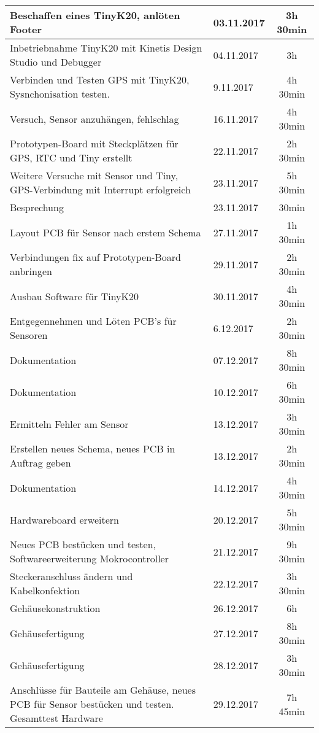 \begin{longtable}{p{9cm}|p{2cm}|c}
		Beschaffen eines TinyK20, anlöten Footer & 03.11.2017 & 3h 30min \\\midrule
		Inbetriebnahme TinyK20 mit Kinetis Design Studio und Debugger & 04.11.2017 & 3h \\ \midrule
		Verbinden und Testen GPS mit TinyK20, Sysnchonisation testen. & 9.11.2017 & 4h 30min\\\midrule
		Versuch, Sensor anzuhängen, fehlschlag & 16.11.2017 & 4h 30min\\\midrule
		Prototypen-Board mit Steckplätzen für GPS, RTC und Tiny erstellt & 22.11.2017 & 2h 30min \\ \midrule
		Weitere Versuche mit Sensor und Tiny, GPS-Verbindung mit Interrupt erfolgreich & 23.11.2017 & 5h 30min\\ \midrule
		Besprechung & 23.11.2017 & 30min \\ \midrule
		Layout PCB für Sensor nach erstem Schema & 27.11.2017 & 1h 30min \\\midrule
		Verbindungen fix auf Prototypen-Board anbringen & 29.11.2017 & 2h 30min \\\midrule	
		Ausbau Software für TinyK20 & 30.11.2017 & 4h 30min\\\midrule
		Entgegennehmen und Löten PCB's für Sensoren & 6.12.2017 & 2h 30min\\\midrule
		Dokumentation & 07.12.2017 & 8h 30min \\\midrule
		Dokumentation & 10.12.2017 & 6h 30min \\\midrule
		Ermitteln Fehler am Sensor & 13.12.2017 & 3h 30min\\\midrule
		Erstellen neues Schema, neues PCB in Auftrag geben & 13.12.2017 & 2h 30min\\\midrule
		Dokumentation & 14.12.2017 & 4h 30min\\\midrule
		Hardwareboard erweitern & 20.12.2017 & 5h 30min \\ \midrule
		Neues PCB bestücken und testen, Softwareerweiterung Mokrocontroller & 21.12.2017 & 9h 30min  \\ \midrule
		Steckeranschluss ändern und Kabelkonfektion & 22.12.2017 & 3h 30min  \\ \midrule
		Gehäusekonstruktion & 26.12.2017 & 6h  \\ \midrule
		Gehäusefertigung & 27.12.2017 & 8h 30min  \\ \midrule
		Gehäusefertigung & 28.12.2017 & 3h 30min  \\ \midrule
		Anschlüsse für Bauteile am Gehäuse, neues PCB für Sensor bestücken und testen. Gesamttest Hardware & 29.12.2017 & 7h 45min  \\ \midrule

\end{longtable}
